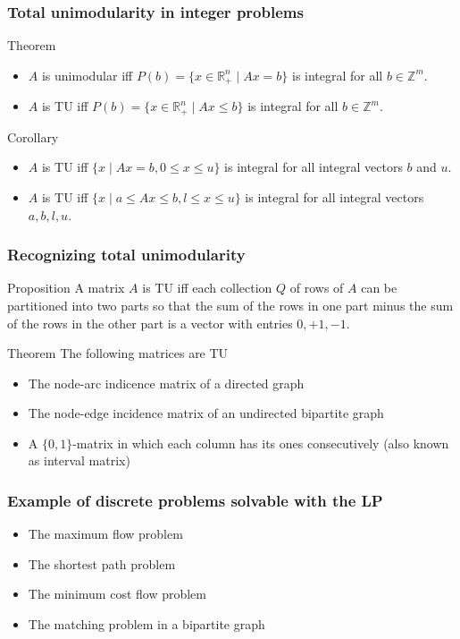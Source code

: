 \documentclass[10pt,handout]{beamer}
\newcommand{\Z}{\mathbb Z}
\newcommand{\R}{\mathbb R}
\begin{document}
\begin{frame}
\frametitle{Total unimodularity in integer problems}
\begin{block}{Theorem}
\begin{itemize}
\item<1-> $A$ is unimodular iff $P(b)=\{x\in \R^n_+\mid Ax=b\}$
is integral for all $b\in \Z^m$.
\item<1-> $A$ is TU iff $P(b)=\{x\in \R^n_+\mid Ax\leq b\}$ is integral for all $b\in \Z^m.$
\end{itemize}
\end{block}
\begin{block}{Corollary}
\begin{itemize}
\item<2-> $A$ is TU iff $\{x\mid Ax=b, 0\leq x\leq u\}$ is integral for all integral vectors $b$ and $u$.
\item<2-> $A$ is TU iff $\{x\mid a\leq Ax\leq b, l\leq x\leq u\}$ is integral
for all integral vectors $a,b,l,u$.
\end{itemize}
\end{block}
\end{frame}
\begin{frame}
\frametitle{Recognizing total unimodularity}
\begin{block}{Proposition}
A matrix $A$ is TU iff each collection $Q$ of rows  of $A$ can be partitioned into two
parts so that the sum of the rows in one part minus the sum of the rows in the other
part is a vector with entries $0, +1, -1$.
\end{block}
\begin{block}{Theorem}
The following matrices are TU
\begin{itemize}
\item<2-> The node-arc indicence matrix of a \alert{directed graph}
\item<2-> The node-edge incidence matrix of an \alert{undirected bipartite graph}
\item<2-> A $\{0,1\}$-matrix in which each column has its ones consecutively
(also known as \alert{interval matrix})
\end{itemize}
\end{block}
\end{frame}
\begin{frame}
\frametitle{Example of discrete problems solvable with the LP}
\begin{itemize}
\item<1-> The maximum flow problem
\item<1-> The shortest path problem
\item<1-> The minimum cost flow problem
\item<1-> The matching problem in a bipartite graph
\end{itemize}
\end{frame}
\end{document}

